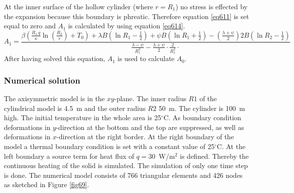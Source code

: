 At the inner surface of the hollow cylinder (where $r=R_1$) no stress is effected by the expansion because this boundary is phreatic. Therefore equation \eqref{eq611} is set equal to zero and $A_1$ is calculated by using equation \eqref{eq614}.
{\small
\begin{equation}
A_1=
\frac{
 \beta\!\left(\frac{
 \textstyle{R_1\,q}}{\textstyle{\kappa}}
 \ln\!\left(\frac{\textstyle{R_2}}{\textstyle{r}}\right)+T_0\right)
 \!+\!
 \lambda B\!\left(\ln R_1\!-\!\frac{1}{2}\right)\!+\!
 \psi B\!\left(\ln R_1\!+\!\frac{1}{2}\right)\!-\!
 \left(\frac{\textstyle{\lambda\!+\!\psi}}{\textstyle{2}}\right)
 2B\left(\ln R_2\!-\!\frac{1}{2}\right)
}
{\frac{
 \textstyle{\lambda-\psi}}{\textstyle{R^2_1}}-
 \frac{\textstyle{\lambda+\psi}}{\textstyle{2}}\cdot
 \frac{\textstyle{2}}{\textstyle{R^2_1}}\cdot
}
\label{eq614}
\end{equation}
}
After having solved this equation, $A_1$ is used to calculate $A_0$.




\subsubsection{Numerical solution}
The axisymmetric model is in the $xy$-plane. The inner radius $R1$ of the cylindrical model is 4.5~m and the outer radius $R2$ 50~m. The cylinder is 100~m high. The initial temperature in the whole area is 25$^{\circ}$C. As boundary condition deformations in $y$-direction at the bottom and the top are suppressed, as well as deformations in $x$-direction at the right border. At the right boundary of the model a thermal boundary condition is set with a constant value of 25$^{\circ}$C. At the left boundary a source term for heat flux of $q=30$~W/m$^2$ is defined. Thereby the continuous heating of the solid is simulated.  The simulation of only one time step is done. The numerical model consists of 766 triangular elements and 426 nodes as sketched in Figure \ref{fig69}.

